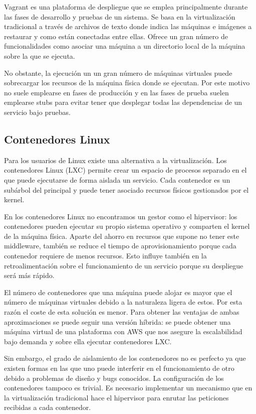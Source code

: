 \documentclass[11pt,a4paper]{article}
\begin{document}
Vagrant es una plataforma de despliegue que se emplea principalmente durante las fases de desarrollo y pruebas de un sistema. Se basa en la virtualización tradicional a través de archivos de texto donde indica las máquinas e imágenes a restaurar y como están conectadas entre ellas. Ofrece un gran número de funcionalidades como asociar una máquina a un directorio local de la máquina sobre la que se ejecuta.

No obstante, la ejecución un un gran número de máquinas virtuales puede sobrecargar los recursos de la máquina física donde se ejecutan. Por este motivo no suele emplearse en fases de producción y en las fases de prueba suelen emplearse stubs para evitar tener que desplegar todas las dependencias de un servicio bajo pruebas.

\subsection{Contenedores Linux}

Para los usuarios de Linux existe una alternativa a la virtualización. Los contenedores Linux (LXC) permite crear un espacio de procesos separado en el que puede ejecutarse de forma aislada un servicio. Cada contenedor es un subárbol del principal y puede tener asociado recursos físicos gestionados por el kernel.

En los contenedores Linux no encontramos un gestor como el hipervisor: los contenedores pueden ejecutar su propio sistema operativo y comparten el kernel de la máquina física. Aparte del ahorro en recursos que supone no tener este middleware, también se reduce el tiempo de aprovisionamiento porque cada contenedor requiere de menos recursos. Esto influye también en la retroalimentación sobre el funcionamiento de un servicio porque su despliegue será más rápido.

El número de contenedores que una máquina puede alojar es mayor que el número de máquinas virtuales debido a la naturaleza ligera de estos. Por esta razón el coste de esta solución es menor. Para obtener las ventajas de ambas aproximaciones se puede seguir una versión híbrida: se puede obtener una máquina virtual de una plataforma con AWS que nos asegure la escalabilidad bajo demanda y sobre ella ejecutar contenedores LXC.

Sin embargo, el grado de aislamiento de los contenedores no es perfecto ya que existen formas en las que uno puede interferir en el funcionamiento de otro debido a problemas de diseño y bugs conocidos. La configuración de los contenedores tampoco es trivial. Es necesario implementar un mecanismo que en la virtualización tradicional hace el hipervisor para enrutar las peticiones recibidas a cada contenedor.
\end{document}
